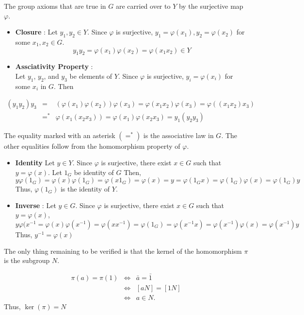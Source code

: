 \documentclass[
]{book}
\begin{document}
The group axioms that are true in \(G\) are carried over to \(Y\) by the
surjective map \(\varphi\).

\begin{itemize}
\item
  \textbf{Closure} : Let \(y_1,y_2\in Y\). Since \(\varphi\) is
  surjective, \(y_1=\varphi(x_1),y_2=\varphi(x_2)\) for some
  \(x_1,x_2\in G\).
  \[y_1y_2=\varphi(x_1)\varphi(x_2)=\varphi(x_1x_2)\in Y\]
\item
  \textbf{Assciativity Property} :\\
  Let \(y_1\), \(y_2\), and \(y_3\) be elements of \(Y\). Since
  \(\varphi\) is surjective, \(y_i = \varphi(x_i)\) for some \(x_i\) in
  \(G\). Then
\end{itemize}

\begin{eqnarray}
(y_1 y_2) y_3 &=& (\varphi(x_1) \varphi(x_2)) \varphi(x_3) = \varphi(x_1 x_2) \varphi(x_3) = \varphi((x_1 x_2) x_3) \\
&=^*& \varphi(x_1 (x_2 x_3)) = \varphi(x_1) \varphi(x_2 x_3) = y_1 (y_2 y_3)
\end{eqnarray}

The equality marked with an asterisk \((=^*)\) is the associative law in
\(G\). The other equalities follow from the homomorphism property of
\(\varphi\).

\begin{itemize}
\item
  \textbf{Identity} Let \(y\in Y\). Since \(\varphi\) is surjective,
  there exist \(x\in G\) such that \(y=\varphi(x)\). Let \(1_G\) be
  identity of \(G\) Then,
  \[y\varphi(1_G)=\varphi(x)\varphi(1_G)=\varphi(x1_G)=\varphi(x)=y=
    \varphi(1_Gx)=\varphi(1_G)\varphi(x)=\varphi(1_G)y\] Thus,
  \(\varphi(1_G)\) is the identity of \(Y\).
\item
  \textbf{Inverse} : Let \(y\in G\). Since \(\varphi\) is surjective,
  there exist \(x\in G\) such that \(y=\varphi(x)\),
  \[y\varphi(x^{-1}=\varphi(x)\varphi(x^{-1})
           =\varphi(xx^{-1})=\varphi(1_G)=\varphi(x^{-1}x)=\varphi(x^{-1})\varphi(x)=\varphi(x^{-1})y\]
  Thus, \(y^{-1}=\varphi(x)\)
\end{itemize}

The only thing remaining to be verified is that the kernel of the
homomorphism \(\pi\) is the subgroup \(N\).

\begin{eqnarray}
\pi (a) =\pi(1) &\iff & \bar{a}= \bar{1}\\
& \iff & [aN] = [1N]\\
& \iff & a \in N.
\end{eqnarray} Thus, \(\ker(\pi)=N\)
\end{document}
